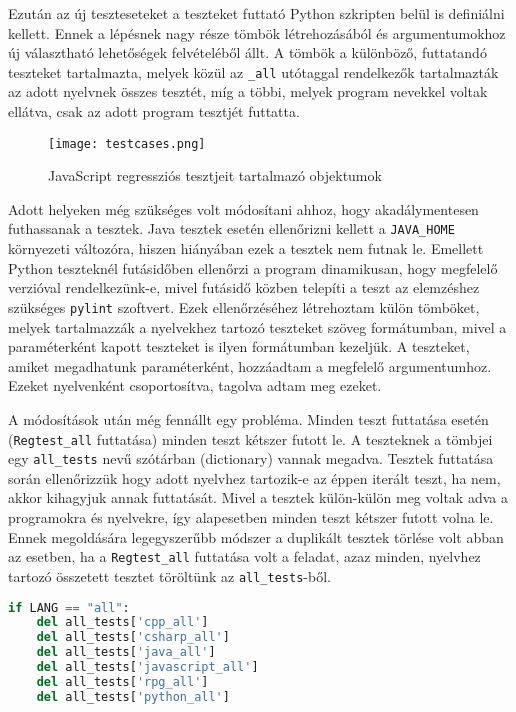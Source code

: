 Ezután az új teszteseteket a teszteket futtató Python szkripten belül is definiálni kellett.
Ennek a lépésnek nagy része tömbök létrehozásából és argumentumokhoz új választható lehetőségek felvételéből állt. A tömbök a különböző, futtatandó teszteket tartalmazta, melyek közül az \texttt{\_all} utótaggal rendelkezők tartalmazták az adott nyelvnek összes tesztét, míg a többi, melyek program nevekkel voltak ellátva, csak az adott program tesztjét futtatta.

\begin{figure}[!htbp]
    \caption{JavaScript regressziós tesztjeit tartalmazó objektumok}\label{fig:testcases}
    \centering
    \texttt{[image: testcases.png]}
\end{figure}

Adott helyeken még szükséges volt módosítani ahhoz, hogy akadálymentesen futhassanak a tesztek. Java tesztek esetén ellenőrizni kellett a \texttt{JAVA\_HOME} környezeti változóra, hiszen hiányában ezek a tesztek nem futnak le. Emellett Python teszteknél futásidőben ellenőrzi a program dinamikusan, hogy megfelelő verzióval rendelkezünk-e, mivel futásidő közben telepíti a teszt az elemzéshez szükséges \texttt{pylint} szoftvert.
Ezek ellenőrzéséhez létrehoztam külön tömböket, melyek tartalmazzák a nyelvekhez tartozó teszteket szöveg formátumban, mivel a paraméterként kapott teszteket is ilyen formátumban kezeljük.
A teszteket, amiket megadhatunk paraméterként, hozzáadtam a megfelelő argumentumhoz. Ezeket nyelvenként csoportosítva, tagolva adtam meg ezeket.

A módosítások után még fennállt egy probléma. Minden teszt futtatása esetén (\texttt{Regtest\_all} futtatása) minden teszt kétszer futott le. A teszteknek a tömbjei egy \texttt{all\_tests} nevű szótárban (dictionary) vannak megadva. Tesztek futtatása során ellenőrizzük hogy adott nyelvhez tartozik-e az éppen iterált teszt, ha nem, akkor kihagyjuk annak futtatását. Mivel a tesztek külön-külön meg voltak adva a programokra és nyelvekre, így alapesetben minden teszt kétszer futott volna le. Ennek megoldására legegyszerűbb módszer a duplikált tesztek törlése volt abban az esetben, ha a \texttt{Regtest\_all} futtatása volt a feladat, azaz minden, nyelvhez tartozó összetett tesztet töröltünk az \texttt{all\_tests}-ből. 


\begin{lstlisting}[caption={Teszt törlési lépések},label={lst:abs-computedfiltering}, language={Python}]
if LANG == "all":
    del all_tests['cpp_all']
    del all_tests['csharp_all']
    del all_tests['java_all']
    del all_tests['javascript_all']
    del all_tests['rpg_all']
    del all_tests['python_all']
\end{lstlisting}